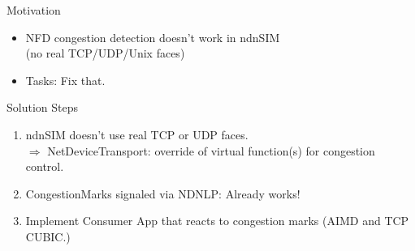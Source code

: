 



\begin{frame}{Motivation}
\begin{itemize}
\item NFD congestion detection doesn't work in ndnSIM\\ (no real TCP/UDP/Unix faces)
\pause
\item Tasks: Fix that. 
\end{itemize}
\end{frame}



\begin{frame}{Solution Steps}

\begin{enumerate}
\item ndnSIM doesn't use real TCP or UDP faces.\\
$\Rightarrow$ NetDeviceTransport: override of
virtual function(s) for congestion control.
\pause

\item CongestionMarks signaled via NDNLP: Already works! 
\pause

\item Implement Consumer App that reacts to congestion marks (AIMD and TCP CUBIC.)

\end{enumerate}

\end{frame}


